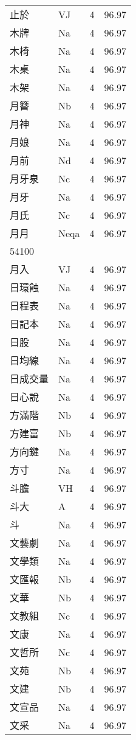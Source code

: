 \documentclass[twocolumn]{book}
\begin{document}
\begin{supertabular}{llrr}
止於 & VJ & 4 &  96.97\\
木牌 & Na & 4 &  96.97\\
木椅 & Na & 4 &  96.97\\
木桌 & Na & 4 &  96.97\\
木架 & Na & 4 &  96.97\\
月簪 & Nb & 4 &  96.97\\
月神 & Na & 4 &  96.97\\
月娘 & Na & 4 &  96.97\\
月前 & Nd & 4 &  96.97\\
月牙泉 & Nc & 4 &  96.97\\
月牙 & Na & 4 &  96.97\\
月氏 & Nc & 4 &  96.97\\
月月 & Neqa & 4 &  96.97\\
54100\\
月入 & VJ & 4 &  96.97\\
日環蝕 & Na & 4 &  96.97\\
日程表 & Na & 4 &  96.97\\
日記本 & Na & 4 &  96.97\\
日股 & Na & 4 &  96.97\\
日均線 & Na & 4 &  96.97\\
日成交量 & Na & 4 &  96.97\\
日心說 & Na & 4 &  96.97\\
方滿階 & Nb & 4 &  96.97\\
方建富 & Nb & 4 &  96.97\\
方向鍵 & Na & 4 &  96.97\\
方寸 & Na & 4 &  96.97\\
斗膽 & VH & 4 &  96.97\\
斗大 & A & 4 &  96.97\\
斗 & Na & 4 &  96.97\\
文藝劇 & Na & 4 &  96.97\\
文學類 & Na & 4 &  96.97\\
文匯報 & Nb & 4 &  96.97\\
文華 & Nb & 4 &  96.97\\
文教組 & Nc & 4 &  96.97\\
文康 & Na & 4 &  96.97\\
文哲所 & Nc & 4 &  96.97\\
文苑 & Nb & 4 &  96.97\\
文建 & Nb & 4 &  96.97\\
文宣品 & Na & 4 &  96.97\\
文采 & Na & 4 &  96.97\\

\end{supertabular}
\end{document}
